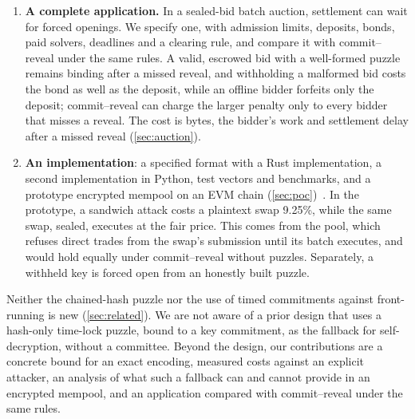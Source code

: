 \begin{enumerate}[label=\arabic*.,leftmargin=1.5em]

  \item \textbf{A complete application.} In a sealed-bid batch auction, settlement can wait for forced openings. We specify one, with admission limits, deposits, bonds, paid solvers, deadlines and a clearing rule, and compare it with commit--reveal under the same rules. A valid, escrowed bid with a well-formed puzzle remains binding after a missed reveal, and withholding a malformed bid costs the bond as well as the deposit, while an offline bidder forfeits only the deposit; commit--reveal can charge the larger penalty only to every bidder that misses a reveal. The cost is bytes, the bidder's work and settlement delay after a missed reveal (\cref{sec:auction}).
  \item \textbf{An implementation}: a specified format with a Rust implementation, a second implementation in Python, test vectors and benchmarks, and a prototype encrypted mempool on an EVM chain (\cref{sec:poc})~\cite{leanSealRepo}. In the prototype, a sandwich attack costs a plaintext swap 9.25\%, while the same swap, sealed, executes at the fair price. This comes from the pool, which refuses direct trades from the swap's submission until its batch executes, and would hold equally under commit--reveal without puzzles. Separately, a withheld key is forced open from an honestly built puzzle.
\end{enumerate}
Neither the chained-hash puzzle nor the use of timed commitments against front-running is new (\cref{sec:related}). We are not aware of a prior design that uses a hash-only time-lock puzzle, bound to a key commitment, as the fallback for self-decryption, without a committee. Beyond the design, our contributions are a concrete bound for an exact encoding, measured costs against an explicit attacker, an analysis of what such a fallback can and cannot provide in an encrypted mempool, and an application compared with commit--reveal under the same rules.

